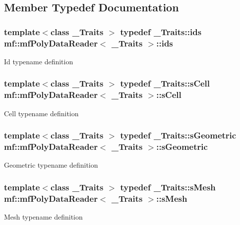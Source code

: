 \subsection{Member Typedef Documentation}
\hypertarget{classmf_1_1mfPolyDataReader_a1d1a716d5dd72816147f86518dcd20a0}{
\subsubsection[{ids}]{\setlength{\rightskip}{0pt plus 5cm}template$<$class \_\-Traits $>$ typedef \_\-Traits::ids {\bf mf::mfPolyDataReader}$<$ \_\-Traits $>$::{\bf ids}}}
\label{classmf_1_1mfPolyDataReader_a1d1a716d5dd72816147f86518dcd20a0}
Id typename definition \hypertarget{classmf_1_1mfPolyDataReader_a712889726fe13348e13c23990d0d412b}{
\subsubsection[{sCell}]{\setlength{\rightskip}{0pt plus 5cm}template$<$class \_\-Traits $>$ typedef \_\-Traits::sCell {\bf mf::mfPolyDataReader}$<$ \_\-Traits $>$::{\bf sCell}}}
\label{classmf_1_1mfPolyDataReader_a712889726fe13348e13c23990d0d412b}
Cell typename definition \hypertarget{classmf_1_1mfPolyDataReader_af064c717a7483939d46991da73d4304d}{
\subsubsection[{sGeometric}]{\setlength{\rightskip}{0pt plus 5cm}template$<$class \_\-Traits $>$ typedef \_\-Traits::sGeometric {\bf mf::mfPolyDataReader}$<$ \_\-Traits $>$::{\bf sGeometric}}}
\label{classmf_1_1mfPolyDataReader_af064c717a7483939d46991da73d4304d}
Geometric typename definition \hypertarget{classmf_1_1mfPolyDataReader_a5343a659b464b89fc0c8b58ee56ed568}{
\subsubsection[{sMesh}]{\setlength{\rightskip}{0pt plus 5cm}template$<$class \_\-Traits $>$ typedef \_\-Traits::sMesh {\bf mf::mfPolyDataReader}$<$ \_\-Traits $>$::{\bf sMesh}}}
\label{classmf_1_1mfPolyDataReader_a5343a659b464b89fc0c8b58ee56ed568}
Mesh typename definition 

